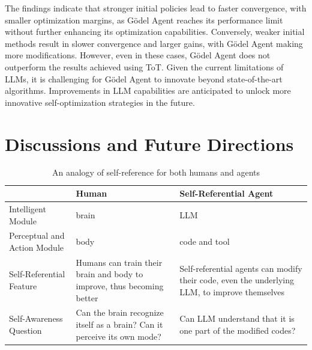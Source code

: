 \documentclass[11pt]{article}
\newcommand{\framework}{Gödel Agent\xspace}
\begin{document}
The findings indicate that stronger initial policies lead to faster convergence, with smaller optimization margins, as \framework reaches its performance limit without further enhancing its optimization capabilities. Conversely, weaker initial methods result in slower convergence and larger gains, with \framework making more modifications. However, even in these cases, \framework does not outperform the results achieved using ToT. Given the current limitations of LLMs, it is challenging for \framework to innovate beyond state-of-the-art algorithms. Improvements in LLM capabilities are anticipated to unlock more innovative self-optimization strategies in the future.




\section{Discussions and Future Directions}

\label{sec:future}
\label{app:future}

\begin{table}[t]
\centering


\begin{tabularx}{\textwidth}{@{}lL L@{}} 
\toprule
                          & \textbf{Human}                                                                         & \textbf{Self-Referential Agent}                                                                 \\ \midrule
Intelligent Module        & brain                                                                                  & LLM                                                                                             \\
Perceptual and Action Module    & body                                                                                   & code and tool                                                                                   \\
Self-Referential Feature  & Humans can train their brain and body to improve, thus becoming better                 & Self-referential agents can modify their code, even the underlying LLM, to improve themselves \\
Self-Awareness Question           & Can the brain recognize itself as a brain? Can it perceive its own mode?               & Can LLM understand that it is one part of the modified codes?                               \\ \bottomrule
\end{tabularx}
\caption{An analogy of self-reference for both humans and agents}
\label{tab:self_reference_analogy}
\end{table}
\end{document}
